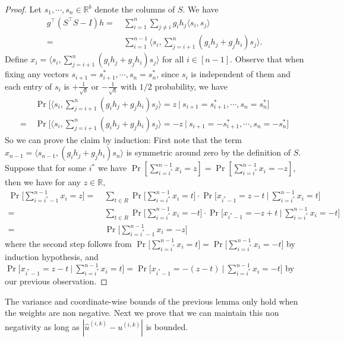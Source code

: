 \documentclass[11pt]{article}
\renewcommand\gg{\boldsymbol{\mathit{g}}}
\newcommand\hh{\boldsymbol{\mathit{h}}}
\renewcommand\ss{\boldsymbol{\mathit{s}}}
\newcommand\uu{\boldsymbol{\mathit{u}}}
\renewcommand\SS{\boldsymbol{\mathit{S}}}
\newcommand{\wh}{\widehat}
\newcommand\R{\mathbb{R}}
\begin{document}
\begin{proof}
Let $\ss_1, \cdots, \ss_n \in \R^b$ denote the columns of $\SS$. We have
\begin{align*}
\gg^{\top} (\SS^{\top} \SS - I) \hh = &~ \sum_{i=1}^n \sum_{j\neq i} \gg_i \hh_j \langle \ss_i, \ss_j \rangle \\
= &~ \sum_{i=1}^{n-1} \Big\langle \ss_i, \sum_{j=i+1}^n (\gg_i \hh_j + \gg_j \hh_i )\ss_j \Big\rangle.
\end{align*}
Define $x_i = \Big\langle \ss_i, \sum_{j=i+1}^n (\gg_i \hh_j + \gg_j \hh_i )\ss_j \Big\rangle$ for all $i \in [n-1]$. Observe that when fixing any vectors $\ss_{i+1} = \ss^*_{i+1}, \cdots, \ss_{n} = \ss^*_{n}$, since $\ss_i$ is independent of them and each entry of $\ss_i$ is $+\frac{1}{\sqrt{b}}$ or $-\frac{1}{\sqrt{b}}$ with $1/2$ probability, we have
\begin{align*}
&~ \Pr\Big[\Big\langle \ss_i, \sum_{j=i+1}^n (\gg_i \hh_j + \gg_j \hh_i )\ss_j \Big\rangle = z ~\Big|~ \ss_{i+1} = \ss^*_{i+1}, \cdots, \ss_{n} = \ss^*_{n} \Big] \\
= &~ \Pr\Big[\Big\langle \ss_i, \sum_{j=i+1}^n (\gg_i \hh_j + \gg_j \hh_i )\ss_j \Big\rangle = -z ~\Big|~ \ss_{i+1} = -\ss^*_{i+1}, \cdots, \ss_{n} = -\ss^*_{n} \Big] 
\end{align*}
So we can prove the claim by induction: First note that the term $x_{n-1} = \Big\langle \ss_{n-1}, (\gg_i \hh_j + \gg_j \hh_i )\ss_n \Big\rangle$ is symmetric around zero by the definition of $\SS$. Suppose that for some $i^*$ we have $\Pr[\sum_{i=i^*}^{n-1} x_i = z] = \Pr[\sum_{i=i^*}^{n-1} x_i = -z]$, then we have for any $z \in \R$,
\begin{align*}
\Pr\Big[\sum_{i=i^*-1}^{n-1} x_i = z\Big]
= &~ \sum_{t \in R} \Pr\Big[\sum_{i=i^*}^{n-1} x_i = t\Big] \cdot \Pr\Big[x_{i^*-1} = z-t ~\Big|~ \sum_{i=i^*}^{n-1} x_i = t\Big] \\
= &~ \sum_{t \in R} \Pr\Big[\sum_{i=i^*}^{n-1} x_i = -t\Big] \cdot \Pr\Big[x_{i^*-1} = -z+t ~\Big|~ \sum_{i=i^*}^{n-1} x_i = -t\Big] \\
= &~ \Pr\Big[\sum_{i=i^*-1}^{n-1} x_i = -z\Big]
\end{align*}
where the second step follows from $\Pr\Big[\sum_{i=i^*}^{n-1} x_i = t\Big] = \Pr\Big[\sum_{i=i^*}^{n-1} x_i = -t\Big]$ by induction hypothesis, and $\Pr\Big[x_{i^*-1} = z-t ~\Big|~ \sum_{i=i^*}^{n-1} x_i = t\Big] = \Pr\Big[x_{i^*-1} = -(z-t) ~\Big|~ \sum_{i=i^*}^{n-1} x_i = -t\Big]$ by our previous observation.
\end{proof}


The variance and coordinate-wise bounds of the previous lemma only hold when the weights are non negative. Next we prove that we can maintain this non negativity as long as $|\wh{\uu}^{(i,k)} - \uu^{(i,k)}|$ is bounded.
\end{document}
